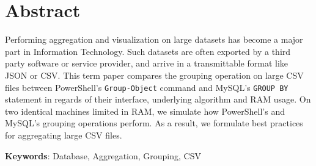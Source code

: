\section*{Abstract}
Performing aggregation and visualization on large datasets has become a major part in Information Technology.
Such datasets are often exported by a third party software or service provider, and arrive in a transmittable
format like JSON or CSV.
This term paper compares the grouping operation on large CSV files between PowerShell's
\verb+Group-Object+ command and MySQL's \verb+GROUP BY+ statement in regards of
their interface, underlying algorithm and RAM usage. On two identical machines
limited in RAM, we simulate how PowerShell's and MySQL's grouping operations perform. As a result,
we formulate best practices for aggregating large CSV files.

\textbf{Keywords}: Database, Aggregation, Grouping, CSV